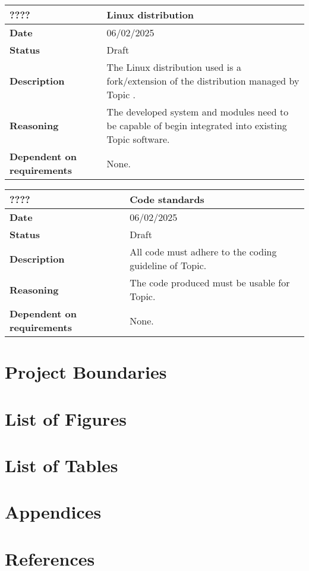 \documentclass{article}
\begin{document}
\begin{table}[H]
    \renewcommand{\arraystretch}{1.3}
    \begin{tabular}{|l|p{10cm}|}
        \hline
        \rowcolor{gray!50}
        \textbf{????} & \textbf{Linux distribution} \\ \hline
        \textbf{Date} & 06/02/2025 \\ \hline
        \textbf{Status} & Draft \\ \hline
        \textbf{Description} & The Linux distribution used is a fork/extension of the distribution managed by Topic \cite{TopicLinuxDistro}. \\ \hline
        \textbf{Reasoning} & The developed system and modules need to be capable of begin integrated into existing Topic software. \\ \hline
        \textbf{Dependent on requirements} & None. \\ \hline
    \end{tabular}
\end{table}

\begin{table}[H]
    \renewcommand{\arraystretch}{1.3}
    \begin{tabular}{|l|p{10cm}|}
        \hline
        \rowcolor{gray!50}
        \textbf{????} & \textbf{Code standards} \\ \hline
        \textbf{Date} & 06/02/2025 \\ \hline
        \textbf{Status} & Draft \\ \hline
        \textbf{Description} & All code must adhere to the coding guideline of Topic. \\ \hline
        \textbf{Reasoning} & The code produced must be usable for Topic. \\ \hline
        \textbf{Dependent on requirements} & None. \\ \hline
    \end{tabular}
\end{table}


\newpage

\section{Project Boundaries}


\newpage

\section{List of Figures}

\section{List of Tables}

\section{Appendices}



\section{References}
\printbibliography
\end{document}

